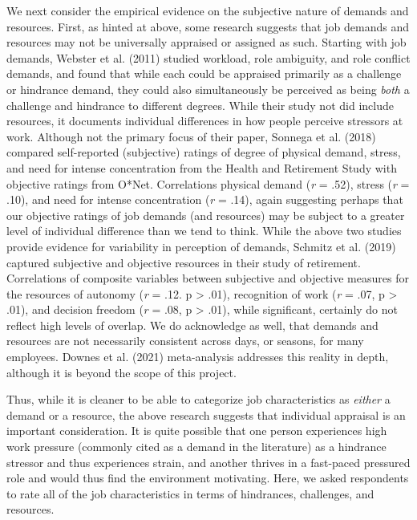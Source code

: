 \documentclass[
  english,
  man]{apa6}
\begin{document}
We next consider the empirical evidence on the subjective nature of demands and resources. First, as hinted at above, some research suggests that job demands and resources may not be universally appraised or assigned as such. Starting with job demands, Webster et al. (2011) studied workload, role ambiguity, and role conflict demands, and found that while each could be appraised primarily as a challenge or hindrance demand, they could also simultaneously be perceived as being \emph{both} a challenge and hindrance to different degrees. While their study not did include resources, it documents individual differences in how people perceive stressors at work. Although not the primary focus of their paper, Sonnega et al. (2018) compared self-reported (subjective) ratings of degree of physical demand, stress, and need for intense concentration from the Health and Retirement Study with objective ratings from O*Net. Correlations physical demand (\emph{r} = .52), stress (\emph{r} = .10), and need for intense concentration (\emph{r} = .14), again suggesting perhaps that our objective ratings of job demands (and resources) may be subject to a greater level of individual difference than we tend to think. While the above two studies provide evidence for variability in perception of demands, Schmitz et al. (2019) captured subjective and objective resources in their study of retirement. Correlations of composite variables between subjective and objective measures for the resources of autonomy (\emph{r} = .12. p \textgreater{} .01), recognition of work (\emph{r} = .07, p \textgreater{} .01), and decision freedom (\emph{r} = .08, p \textgreater{} .01), while significant, certainly do not reflect high levels of overlap. We do acknowledge as well, that demands and resources are not necessarily consistent across days, or seasons, for many employees. Downes et al. (2021) meta-analysis addresses this reality in depth, although it is beyond the scope of this project.

Thus, while it is cleaner to be able to categorize job characteristics as \emph{either} a demand or a resource, the above research suggests that individual appraisal is an important consideration. It is quite possible that one person experiences high work pressure (commonly cited as a demand in the literature) as a hindrance stressor and thus experiences strain, and another thrives in a fast-paced pressured role and would thus find the environment motivating. Here, we asked respondents to rate all of the job characteristics in terms of hindrances, challenges, and resources.
\end{document}
